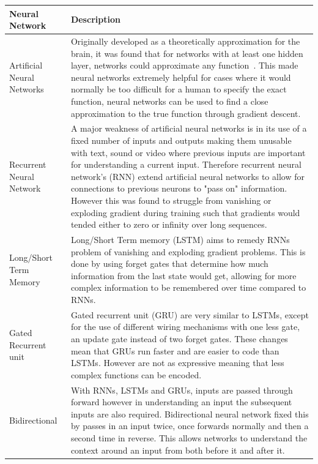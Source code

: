 \begin{longtable}{|p{3.5cm}|p{12cm}|} \hline
    \textbf{Neural Network} & \textbf{Description} \\ \hline
    Artificial Neural Networks \citep{ANN} & Originally developed as a theoretically approximation for the brain, it
        was found that for networks with at least one hidden layer, networks could approximate any
        function~\citep{csaji2001approximation}. This made neural networks extremely helpful for cases where it would
        normally be too difficult for a human to specify the exact function, neural networks can be used to find a
        close approximation to the true function through gradient descent. \\ \hline

    Recurrent Neural Network~\citep{RNN} & A major weakness of artificial neural networks is in its use of a fixed
        number of inputs and outputs making them unusable with text, sound or video where previous inputs are important
        for understanding a current input. Therefore recurrent neural network's (RNN) extend artificial neural networks
        to allow for connections to previous neurons to "pass on" information. However this was found to struggle from
        vanishing or exploding gradient during training such that gradients would tended either to zero or infinity
        over long sequences. \\ \hline

    Long/Short Term Memory \citep{LSTM} & Long/Short Term memory (LSTM) aims to remedy RNNs problem of vanishing and
        exploding gradient problems. This is done by using forget gates that determine how much information from the
        last state would get, allowing for more complex information to be remembered over time compared to RNNs. \\ \hline

    Gated Recurrent unit~\citep{GRU} & Gated recurrent unit (GRU) are very similar to LSTMs, except for the use of
        different wiring mechanisms with one less gate, an update gate instead of two forget gates. These changes mean
        that GRUs run faster and are easier to code than LSTMs. However are not as expressive meaning that less complex
        functions can be encoded. \\ \hline

    Bidirectional \citep{Bidirectional} & With RNNs, LSTMs and GRUs, inputs are passed through forward however in
        understanding an input the subsequent inputs are also required. Bidirectional neural network fixed this by
        passes in an input twice, once forwards normally and then a second time in reverse. This allows networks to
        understand the context around an input from both before it and after it. \\ \hline


\end{longtable}
